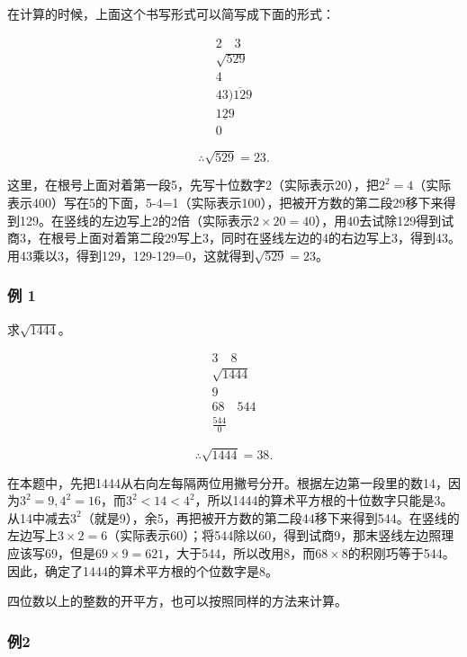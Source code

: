 在计算的时候，上面这个书写形式可以简写成下面的形式：

\[
\begin{array}{r} 2 \quad 3 \\ \sqrt {529} \\ 4 \\ 43 \overline {{) 129}} \\ \underline {{129}} \\ 0 \end{array}
\]

\[
\therefore \sqrt{529} = 23.
\]

这里，在根号上面对着第一段5，先写十位数字2（实际表示20），把\(2^{2}=4\)（实际表示400）写在5的下面，5-4=1（实际表示100），把被开方数的第二段29移下来得到129。在竖线的左边写上2的2倍（实际表示\(2\times20=40\)），用40去试除129得到试商3，在根号上面对着第二段29写上3，同时在竖线左边的4的右边写上3，得到43。用43乘以3，得到129，129-129=0，这就得到\(\sqrt{529} = 23\)。

\subsubsection{例 1}

求\(\sqrt{1444}\)。


\[
\begin{array}{r} 3 \quad 8 \\ \sqrt {1444} \\ 9 \\ 68 \quad 544 \\ \frac{544}{0} \end{array}
\]

\[
\therefore \sqrt {1444} = 38.
\]

在本题中，先把1444从右向左每隔两位用撇号分开。根据左边第一段里的数14，因为\(3^{2}=9,4^{2}=16\)，而\(3^{2}<14<4^{2}\)，所以1444的算术平方根的十位数字只能是3。从14中减去\(3^{2}\)（就是9），余5，再把被开方数的第二段44移下来得到544。在竖线的左边写上\(3\times2=6\)（实际表示60）；将544除以60，得到试商9，那末竖线左边照理应该写69，但是\(69\times9=621\)，大于544，所以改用8，而\(68\times8\)的积刚巧等于544。因此，确定了1444的算术平方根的个位数字是8。

四位数以上的整数的开平方，也可以按照同样的方法来计算。

\subsubsection{例2}

